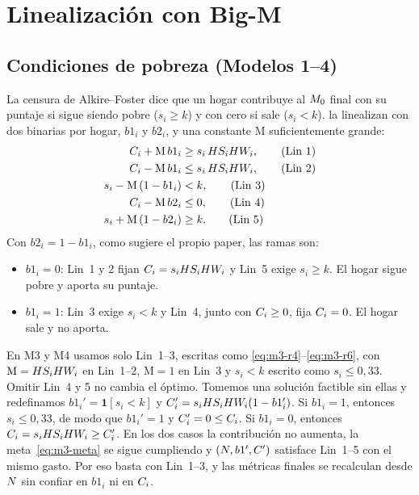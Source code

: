 \section{Linealización con Big-M}\label{app:lin}

\subsection{Condiciones de pobreza (Modelos 1--4)}

La censura de Alkire--Foster dice que un hogar contribuye al $M_0$ final con su
puntaje si sigue siendo pobre ($s_i\ge k$) y con cero si sale ($s_i<k$).
\citet[Apéndice~1]{hamie2024} la linealizan con dos binarias por hogar, $b1_i$ y
$b2_i$, y una constante $\mathrm{M}$ suficientemente grande:
\begin{align}
C_i + \mathrm{M}\, b1_i &\ge s_i\,HS_iHW_i, \tag{Lin 1}\\
C_i - \mathrm{M}\, b1_i &\le s_i\,HS_iHW_i, \tag{Lin 2}\\
s_i - \mathrm{M}\,(1-b1_i) &< k, \tag{Lin 3}\\
C_i - \mathrm{M}\, b2_i &\le 0, \tag{Lin 4}\\
s_i + \mathrm{M}\,(1-b2_i) &\ge k. \tag{Lin 5}
\end{align}
Con $b2_i=1-b1_i$, como sugiere el propio paper, las ramas son:
\begin{itemize}
\item $b1_i=0$: Lin~1 y 2 fijan $C_i=s_iHS_iHW_i$ y Lin~5 exige $s_i\ge k$.
  El hogar sigue pobre y aporta su puntaje.
\item $b1_i=1$: Lin~3 exige $s_i<k$ y Lin~4, junto con $C_i\ge 0$, fija
  $C_i=0$. El hogar sale y no aporta.
\end{itemize}

En M3 y M4 usamos solo Lin~1--3, escritas como
\eqref{eq:m3-r4}--\eqref{eq:m3-r6}, con $\mathrm{M}=HS_iHW_i$ en Lin~1--2,
$\mathrm{M}=1$ en Lin~3 y $s_i<k$ escrito como $s_i\le 0{,}33$. Omitir Lin~4 y 5 no
cambia el óptimo. Tomemos una solución factible sin ellas y redefinamos
$b1_i'=\mathbf{1}[s_i<k]$ y $C_i'=s_iHS_iHW_i(1-b1_i')$. Si $b1_i=1$,
entonces $s_i\le 0{,}33$, de modo que $b1_i'=1$ y $C_i'=0\le C_i$. Si
$b1_i=0$, entonces $C_i=s_iHS_iHW_i\ge C_i'$. En los dos casos la
contribución no aumenta, la meta~\eqref{eq:m3-meta} se sigue cumpliendo y
$(N,b1',C')$ satisface Lin~1--5 con el mismo gasto. Por eso basta con
Lin~1--3, y las métricas finales se recalculan desde $N$ sin confiar en
$b1_i$ ni en $C_i$.

